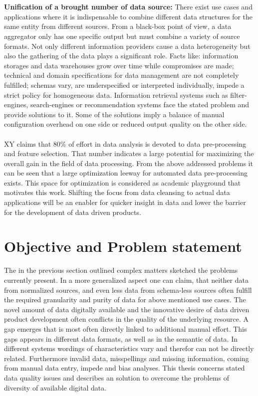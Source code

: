 \\\\
\textbf{Unification of a brought number of data source:} There exist use cases and applications where it is indispensable to combine different data structures for the same entity from different sources. From a black-box point of view, a data aggregator only has one specific output but must combine a variety of source formats. Not only different information providers cause a data  heterogeneity but also the gathering of the data plays a significant role. Facts like: information storages and data warehouses grow over time while compromises are made; technical and domain specifications for data management are not completely fulfilled; schemas vary, are underspecified or interpreted individually, impede a strict policy for homogeneous data. Information retrieval systems such as filter-engines, search-engines or recommendation systems face the stated problem and provide solutions to it. Some of the solutions imply a balance of manual configuration overhead on one side or reduced output quality on the other side. 
\\\\
XY claims that 80\% of effort in data analysis is devoted to data pre-processing and feature selection. That number indicates a large potential for maximizing the overall gain in the field of data processing. From the above addressed problems it can be seen that a large optimization leeway for automated data pre-processing exists. This space for optimization is considered as academic playground that motivates this work. Shifting the focus from data cleansing to actual data applications will be an enabler for quicker insight in data and lower the barrier for the development of data driven products.

\section{Objective and Problem statement\label{sec:objective}}
The in the previous section outlined complex matters sketched the problems currently present. In a more generalized aspect one can claim, that neither data from normalized sources, and even less data from schema-less sources often fulfill the required granularity and purity of data for above mentioned use cases. The novel amount of data digitally available and the innovative desire of data driven product development often conflicts in the quality of the underlying resource. A gap emerges that is most often directly linked to additional manual effort. This gaps appears in different data formats, as well as in the semantic of data. In different systems wordings of characteristics vary and therefor can not be directly related. Furthermore invalid data, misspellings and missing information, coming from manual data entry, impede and bias analyses. This thesis concerns stated data quality issues and describes an solution to overcome the problems of diversity of available digital data.

